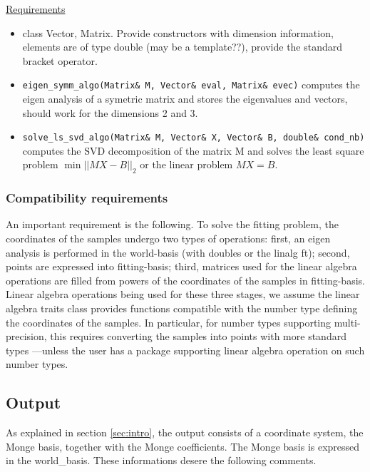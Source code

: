 \noindent \underline{Requirements} 

\begin{itemize}
\item 
class Vector, Matrix.  Provide constructors with dimension
information, elements are of type double (may be a template??),
provide the standard bracket operator.
\item 
{\tt eigen\_symm\_algo(Matrix\& M, Vector\& eval, Matrix\& evec)} computes
the eigen analysis of a symetric matrix and stores the eigenvalues and 
vectors, should work for the dimensions 2 and 3.
\item
{\tt solve\_ls\_svd\_algo(Matrix\& M, Vector\& X, Vector\& B, double\&
cond\_nb)} computes the SVD decomposition of the matrix M and solves
the least square problem $\min ||MX-B||_2$ or the linear problem
$MX=B$.
\end{itemize}



\subsubsection{Compatibility requirements}

An important requirement is the following. To solve the fitting
problem, the coordinates of the samples undergo two types of
operations: first, an eigen analysis is performed in the world-basis
(with doubles or the linalg ft); second, points are expressed into
fitting-basis; third, matrices used for the linear algebra operations
are filled from powers of the coordinates of the samples in
fitting-basis. Linear algebra operations being used for these three
stages, we assume the linear algebra traits class provides functions
compatible with the number type defining the coordinates of the
samples. In particular, for number types supporting multi-precision,
this requires converting the samples into points with more standard
types ---unless the user has a package supporting linear algebra
operation on such number types.



\subsection{Output}

As explained in section \ref{sec:intro}, the output consists of a
coordinate system, the Monge basis, together with the Monge
coefficients. The Monge basis is expressed in the world\_basis. These
informations desere the following comments.

